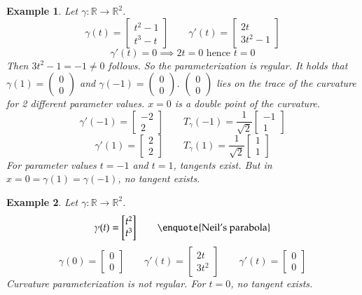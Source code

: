 \documentclass{article}
\newtheorem{example}{Example}  \numberwithin{example}{section}
\newcommand{\vectwo}[2]{\begin{pmatrix} #1 \\ #2 \end{pmatrix}}
\begin{document}
\begin{example}
  Let $\gamma: \mathbb R \to \mathbb R^2$.
  \[ \gamma(t) = \begin{bmatrix} t^2 - 1 \\ t^3 - t \end{bmatrix} \qquad \gamma'(t) = \begin{bmatrix} 2t \\ 3t^2 - 1 \end{bmatrix} \]
  \[ \gamma'(t) = 0 \implies 2t = 0 \text{ hence } t = 0 \]
  Then $3t^2 - 1 = -1 \neq 0$ follows.
  So the parameterization is \emph{regular}. It holds that $\gamma(1) = \vectwo 00$ and $\gamma(-1) = \vectwo 00$.
  $\vectwo 00$ lies on the trace of the curvature for 2 different parameter values.
  $x = 0$ is a double point of the curvature.
  \[ \gamma'(-1) = \begin{bmatrix} -2 \\ 2 \end{bmatrix} \qquad T_{\gamma}(-1) = \frac1{\sqrt{2}} \begin{bmatrix} -1 \\ 1 \end{bmatrix} \]
  \[ \gamma'(1) = \begin{bmatrix} 2 \\ 2 \end{bmatrix} \qquad T_{\gamma}(1) = \frac1{\sqrt{2}} \begin{bmatrix} 1 \\ 1 \end{bmatrix} \]
  For parameter values $t = -1$ and $t = 1$, tangents exist. But in $x = 0 = \gamma(1) = \gamma(-1)$, no tangent exists.
\end{example}

\begin{example}
  Let $\gamma: \mathbb R \to \mathbb R^2$.
  \[ \gamma(t) = \begin{bmatrix} t^2 \\ t^3 \end{bmatrix} \qquad \text{\enquote{Neil's parabola}} \]
  \[ \gamma(0) = \begin{bmatrix} 0 \\ 0 \end{bmatrix} \qquad \gamma'(t) = \begin{bmatrix} 2t \\ 3t^2 \end{bmatrix} \qquad \gamma'(t) = \begin{bmatrix} 0 \\ 0 \end{bmatrix} \]
  Curvature parameterization is not regular.
  For $t = 0$, no tangent exists.
\end{example}
\end{document}
